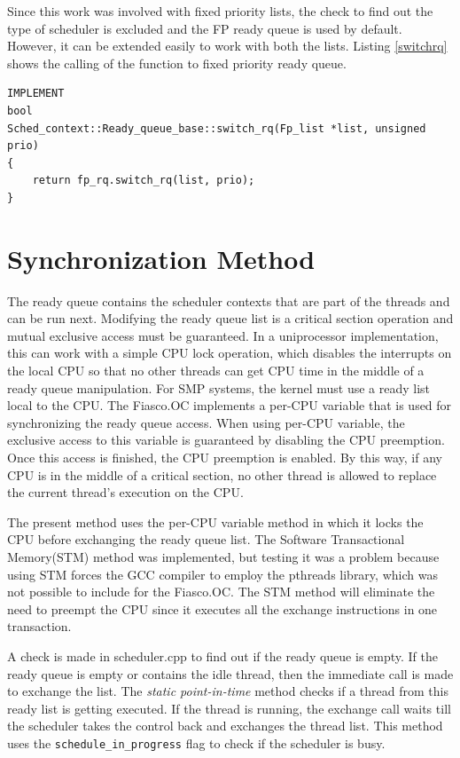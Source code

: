 Since this work was involved with fixed priority lists, the check to find out the type of scheduler is excluded and the FP ready queue is used by default. However, it can be extended easily to work with both the lists. Listing \ref{switchrq} shows the calling of the function to fixed priority ready queue.

\begin{lstlisting}[caption={Exchanging the ready queue},label=switchrq, style=customcpp]
IMPLEMENT
bool
Sched_context::Ready_queue_base::switch_rq(Fp_list *list, unsigned prio)
{
	return fp_rq.switch_rq(list, prio);
}
\end{lstlisting}

\section{Synchronization Method}\label{imp:sync}

The ready queue contains the scheduler contexts that are part of the threads and can be run next. Modifying the ready queue list is a critical section operation and mutual exclusive access must be guaranteed. In a uniprocessor implementation, this can work with a simple CPU lock operation, which disables the interrupts on the local CPU so that no other threads can get CPU time in the middle of a ready queue manipulation. For SMP systems, the kernel must use a ready list local to the CPU. The Fiasco.OC implements a per-CPU variable that is used for synchronizing the ready queue access. When using per-CPU variable, the exclusive access to this variable is guaranteed by disabling the CPU preemption. Once this access is finished, the CPU preemption is enabled. By this way, if any CPU is in the middle of a critical section, no other thread is allowed to replace the current thread's execution on the CPU. 

The present method uses the per-CPU variable method in which it locks the CPU before exchanging the ready queue list. The Software Transactional Memory(STM) method was implemented, but testing it was a problem because using STM forces the GCC compiler to employ the pthreads library, which was not possible to include for the Fiasco.OC. The STM method will eliminate the need to preempt the CPU since it executes all the exchange instructions in one transaction.

A check is made in scheduler.cpp to find out if the ready queue is empty. If the ready queue is empty or contains the idle thread, then the immediate call is made to exchange the list. The \textit{static point-in-time} method checks if a thread from this ready list is getting executed. If the thread is running, the exchange call waits till the scheduler takes the control back and exchanges the thread list. This method uses the  \texttt{schedule\_in\_progress} flag to check if the scheduler is busy.

